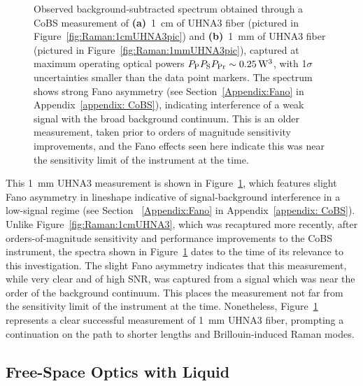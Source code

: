 \begin{figure}[h!]
\begin{subfigure}[b]{0.49\textwidth}
    \caption{}
    \label{fig:Raman:1mmUHNA3}
  \end{subfigure}
  \caption[\ac{CoBS} measurements of \SI{1}{\centi\meter} and \SI{1}{\milli\meter} \ac{UHNA3} fiber, in pursuit of observing Brillouin-induced Raman modes.]{Observed background-subtracted spectrum obtained through a \ac{CoBS} measurement of \textbf{(a)}~\SI{1}{\centi\meter} of \ac{UHNA3} fiber (pictured in Figure~\ref{fig:Raman:1cmUHNA3pic}) and \textbf{(b)}~\SI{1}{\milli\meter} of \ac{UHNA3} fiber (pictured in Figure~\ref{fig:Raman:1mmUHNA3pic}), captured at maximum operating optical powers \(P_{\rm P}P_{\rm S}P_{\rm Pr} \sim \SI{0.25}{\cubic\watt}\), with 1\(\sigma\) uncertainties smaller than the data point markers. The spectrum shows strong Fano asymmetry (see Section~\ref{Appendix:Fano} in Appendix~\ref{appendix: CoBS}), indicating interference of a weak signal with the broad background continuum. This is an older measurement, taken prior to orders of magnitude sensitivity improvements, and the Fano effects seen here indicate this was near the sensitivity limit of the instrument at the time.}
  \label{fig:Raman:UHNA3}
\end{figure}

This \SI{1}{\milli\meter} \ac{UHNA3} measurement is shown in Figure~\ref{fig:Raman:1mmUHNA3}, which features slight Fano asymmetry in lineshape indicative of signal-background interference in a low-signal regime (see Section ~\ref{Appendix:Fano} in Appendix~\ref{appendix: CoBS}). Unlike Figure~\ref{fig:Raman:1cmUHNA3}, which was recaptured more recently, after orders-of-magnitude sensitivity and performance improvements to the \ac{CoBS} instrument, the spectra shown in Figure~\ref{fig:Raman:1mmUHNA3} dates to the time of its relevance to this investigation. The slight Fano asymmetry indicates that this measurement, while very clear and of high SNR, was captured from a signal which was near the order of the background continuum. This places the measurement not far from the sensitivity limit of the instrument at the time. Nonetheless, Figure~\ref{fig:Raman:1mmUHNA3} represents a clear successful measurement of \SI{1}{\milli\meter} \ac{UHNA3} fiber, prompting a continuation on the path to shorter lengths and Brillouin-induced Raman modes.

\subsection{Free-Space Optics with Liquid \texorpdfstring{}{CS2}}
\label{subsec:Raman:Target:CS2Vial}

